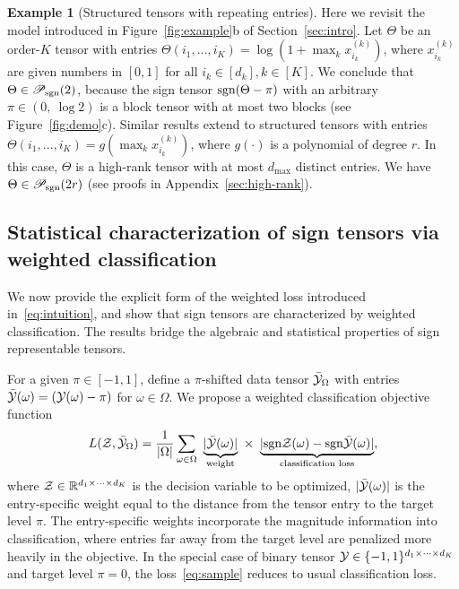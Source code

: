 \documentclass{article}
\theoremstyle{plain}
\theoremstyle{definition}
\newtheorem{example}{Example}
\newcommand*{\KeepStyleUnderBrace}[1]{%
  \mathop{%
    \mathchoice
    {\underbrace{\displaystyle#1}}%
    {\underbrace{\textstyle#1}}%
    {\underbrace{\scriptstyle#1}}%
    {\underbrace{\scriptscriptstyle#1}}%
  }\limits
}
\def\sign{\textup{sgn}}
\def\caliP{\mathscr{P}_{\textup{sgn}}}
\begin{document}
\begin{example}[Structured tensors with repeating entries]\label{eq:example} Here we revisit the model introduced in Figure~\ref{fig:example}b of Section~\ref{sec:intro}. Let $\Theta$ be an order-$K$ tensor with entries $\Theta(i_1,\ldots,i_K)=\log(1+\max_kx^{(k)}_{i_k})$, where $x^{(k)}_{i_k}$ are given numbers in $[0,1]$ for all $i_k\in[d_k], k\in[K]$. We conclude that $\Theta \in \caliP(2)$, because the sign tensor $\sign(\Theta-\pi)$ with an arbitrary $\pi\in(0,\ \log 2)$ is a block tensor with at most two blocks (see Figure~\ref{fig:demo}c). Similar results extend to structured tensors with entries $\Theta(i_1,\ldots,i_K)=g(\max_kx^{(k)}_{i_k})$, where $g(\cdot)$ is a polynomial of degree $r$. In this case, $\Theta$ is a high-rank tensor with at most $d_{\max}$ distinct entries. We have $\Theta\in \caliP(2r)$ (see proofs in Appendix~\ref{sec:high-rank}). 
\end{example}


\subsection{Statistical characterization of sign tensors via weighted classification}\label{sec:identifiability}
We now provide the explicit form of the weighted loss introduced in~\eqref{eq:intuition}, and show that sign tensors are characterized by weighted classification. The results bridge the algebraic and statistical properties of sign representable tensors.
 
For a given $\pi \in [-1,1]$, define a $\pi$-shifted data tensor $\bar {\mathcal{Y}}_\Omega$ with entries $\bar {\mathcal{Y}}(\omega) = (\mathcal{Y}(\omega)-\pi)$ for $\omega\in \Omega$. We propose a weighted classification objective function
\begin{equation}\label{eq:sample}
L(\tZ, \bar \tY_\Omega)= {1\over |\Omega|}\sum_{\omega \in \Omega}\ \KeepStyleUnderBrace{|\bar \tY(\omega)|}_{\text{weight}}\  \times \ \KeepStyleUnderBrace{| \sign \tZ(\omega)-\sign \bar \tY(\omega)|}_{\text{classification loss}},
\end{equation}
where $\mathcal{Z}\in\mathbb{R}^{d_1\times \cdots \times d_K}$ is the decision variable to be optimized, $|\bar {\mathcal{Y}}(\omega)|$ is the entry-specific weight equal to the distance from the tensor entry to the target level $\pi$. The entry-specific weights incorporate the magnitude information into classification, where entries far away from the target level are penalized more heavily in the objective. In the special case of binary tensor $\mathcal{Y}\in\{-1,1\}^{d_1\times\cdots\times d_K}$ and target level $\pi=0$, the loss~\eqref{eq:sample} reduces to usual classification loss. 
\end{document}
